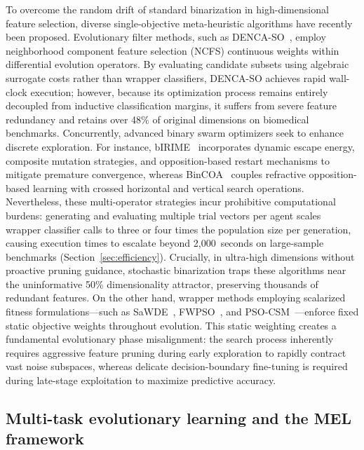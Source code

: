 To overcome the random drift of standard binarization in high-dimensional feature selection, diverse single-objective meta-heuristic algorithms have recently been proposed. Evolutionary filter methods, such as DENCA-SO~\cite{hancer2023}, employ neighborhood component feature selection (NCFS) continuous weights within differential evolution operators. By evaluating candidate subsets using algebraic surrogate costs rather than wrapper classifiers, DENCA-SO achieves rapid wall-clock execution; however, because its optimization process remains entirely decoupled from inductive classification margins, it suffers from severe feature redundancy and retains over 48\% of original dimensions on biomedical benchmarks. Concurrently, advanced binary swarm optimizers seek to enhance discrete exploration. For instance, bIRIME~\cite{su2024} incorporates dynamic escape energy, composite mutation strategies, and opposition-based restart mechanisms to mitigate premature convergence, whereas BinCOA~\cite{shikoun2024} couples refractive opposition-based learning with crossed horizontal and vertical search operations. Nevertheless, these multi-operator strategies incur prohibitive computational burdens: generating and evaluating multiple trial vectors per agent scales wrapper classifier calls to three or four times the population size per generation, causing execution times to escalate beyond 2,000~seconds on large-sample benchmarks (Section~\ref{sec:efficiency}). Crucially, in ultra-high dimensions without proactive pruning guidance, stochastic binarization traps these algorithms near the uninformative 50\% dimensionality attractor, preserving thousands of redundant features. On the other hand, wrapper methods employing scalarized fitness formulations---such as SaWDE~\cite{wang2022}, FWPSO~\cite{wangjia2022}, and PSO-CSM~\cite{wei2025}---enforce fixed static objective weights throughout evolution. This static weighting creates a fundamental evolutionary phase misalignment: the search process inherently requires aggressive feature pruning during early exploration to rapidly contract vast noise subspaces, whereas delicate decision-boundary fine-tuning is required during late-stage exploitation to maximize predictive accuracy.

\subsection{Multi-task evolutionary learning and the MEL framework}\label{sec:mel}

